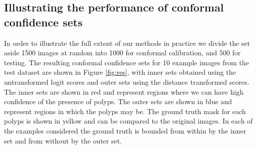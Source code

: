 \subsection{Illustrating the performance of conformal confidence sets}\label{SS:val}
In order to illustrate the full extent of our methods in practice we divide the set aside 1500 images at random into 1000 for conformal calibration, and 500 for testing. The resulting conformal confidence sets for 10 example images from the test dataset are shown in Figure \ref{fig:res}, with inner sets obtained using the untransformed logit scores and outer sets using the distance transformed scores. The inner sets are shown in red and represent regions where we can have high confidence of the presence of polyps. The outer sets are shown in blue and represent regions in which the polyps may be. The ground truth mask for each polyps is shown in yellow and can be compared to the original images. In each of the examples considered the ground truth is bounded from within by the inner set and from without by the outer set. 
